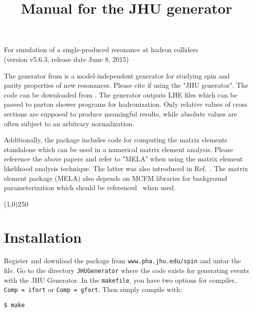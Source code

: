 \documentclass[aps,superscriptaddress,nofootinbib]{revtex4}
\begin{document}
\vspace{0.6cm}

\title{
\large
Manual for the JHU generator
}
\maketitle
\begin{center}
\small
For simulation of a single-produced resonance at hadron colliders \\
(version v5.6.3, release date June 8, 2015) \\
\normalsize
\end{center}

\noindent
The generator from \cite{Gao:2010qx,Bolognesi:2012,Anderson:2013} is a model-independent generator for studying spin and parity properties of new resonances.
Please cite \cite{Gao:2010qx,Bolognesi:2012,Anderson:2013} if using the "JHU generator".
The code can be downloaded from \cite{thesite}.
The generator outputs LHE files which can be passed to parton shower programs for hadronization.
Only relative values of cross sections are supposed to produce meaningful results, while absolute values are often subject to an arbitrary normalization.

Additionally, the package includes code for computing the matrix elements standalone which can be used in a numerical matrix element analysis.
Please reference the above papers and refer to "MELA" when using the matrix element likelihood analysis technique.
The latter was also introduced in Ref.~\cite{Chatrchyan:2012ufa}. The matrix element package (MELA) also depends
on MCFM libraries for background parameterization which should be referenced~\cite{Campbell:2010ff} when used.

\vspace{0.5cm}
\begin{center}
\line(1,0){250}
\end{center}
\vspace{0.5cm}
\tableofcontents
\begin{center}
\end{center}
\vspace{0.5cm}


\section{ Installation }

\noindent
Register and download the package from \verb|www.pha.jhu.edu/spin| and untar the file.  Go to the directory \verb|JHUGenerator| where the code exists for generating events with the JHU Generator. In the \verb|makefile|, you have two options for compiler, \verb|Comp = ifort| or \verb|Comp = gfort|.  Then simply compile with:
\begin{verbatim}
$ make
\end{verbatim}
\end{document}
